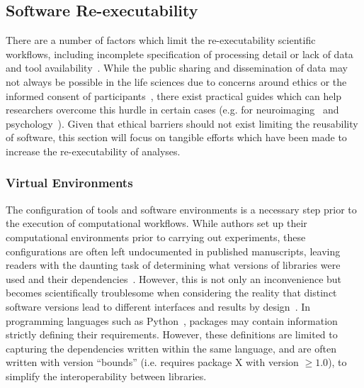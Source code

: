 \subsection{Software Re-executability}
There are a number of factors which limit the re-executability scientific workflows, including incomplete specification
of processing detail or lack of data and tool availability~\cite{ioannidis2009repeatability}. While the public sharing
and dissemination of data may not always be possible in the life sciences due to concerns around ethics or the informed
consent of participants~\cite{ross2018ethical,duke2013ethics}, there exist practical guides which can help researchers
overcome this hurdle in certain cases (e.g. for neuroimaging~\cite{brakewood2013ethics} and
psychology~\cite{meyer2018practical}). Given that ethical barriers should not exist limiting the reusability of
software, this section will focus on tangible efforts which have been made to increase the re-executability of
analyses.

\subsubsection{Virtual Environments}
The configuration of tools and software environments is a necessary step prior to the execution of computational
workflows. While authors set up their computational environments prior to carrying out experiments, these
configurations are often left undocumented in published manuscripts, leaving readers with the daunting task of
determining what versions of libraries were used and their dependencies~\cite{robles2010replicating}. However, this is
not only an inconvenience but becomes scientifically troublesome when considering the reality that distinct software
versions lead to different interfaces and results by design~\cite{raymond1997cathedral}. In programming languages such
as Python~\cite{oliphant2007python}, packages may contain information strictly defining their requirements. However,
these definitions are limited to capturing the dependencies written within the same language, and are often written
with version ``bounds'' (i.e. requires package X with version $\geq 1.0$), to simplify the interoperability between
libraries.

